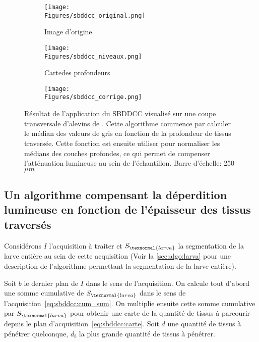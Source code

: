 \documentclass[\main/main.tex]{subfiles}
\begin{document}
\begin{figure}[h!]
\begin{center}
    \begin{subfigure}[b]{0.30\textwidth}
        \caption{
            \label{fig:sbddcc:original}
            Image d'origine
            }
       \centering \texttt{[image: \\Figures/sbddcc\_original.png]}
    \end{subfigure}
    \begin{subfigure}[b]{0.30\textwidth}
        \caption{
            \label{fig:sbddcc:niveaux}
        Carte\newline des profondeurs
            }
       \centering \texttt{[image: \\Figures/sbddcc\_niveaux.png]}
    \end{subfigure}
    \begin{subfigure}[b]{0.30\textwidth}
        \caption{
            \label{fig:sbddcc:correction}
            }
       \centering \texttt{[image: \\Figures/sbddcc\_corrige.png]}
    \end{subfigure}
    \caption{
    Résultat de l'application du SBDDCC visualisé sur une coupe transversale d'alevins de \pz{}.
    \newline
    Cette algorithme commence par calculer le médian des valeurs de gris en fonction de la profondeur de tissus traversée.
    Cette fonction est ensuite utiliser pour normaliser les médians des couches profondes, ce qui permet de compenser l'atténuation lumineuse au sein de l'échantillon.
    \newline
    Barre d'échelle: 250~$\mu{}m$
    }
\end{center}
\end{figure}

\subsection{Un algorithme compensant la déperdition lumineuse en fonction de l'épaisseur des tissus traversés}

%
Considérons $I$ l'acquisition à traiter et $S_{\texnormal{larva}}$ la segmentation de la larve entière au sein de cette acquisition (Voir la \autoref{sec:algo:larva} pour une description de l'algorithme permettant la segmentation de la larve entière).

%
Soit $b$ le dernier plan de $I$ dans le sens de l'acquisition.
%
On calcule tout d'abord une somme cumulative de $S_{\texnormal{larva}}$ dans le sens de l'acquisition~\eqref{eq:sbddcc:cum_sum}.
%
On multiplie ensuite cette somme cumulative par $S_{\texnormal{larva}}$ pour obtenir une carte de la quantité de tissus à parcourir depuis le plan d'acquisition~\eqref{eq:sbddcc:carte}.
%
Soit $d$ une quantité de tissus à pénétrer quelconque, $d_b$ la plus grande quantité de tissus à pénétrer.
\end{document}
